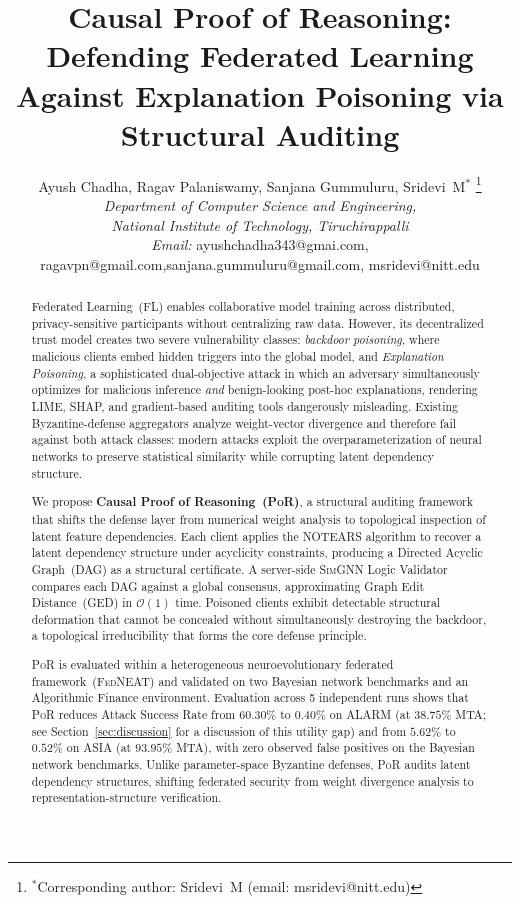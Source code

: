 \documentclass[journal]{IEEEtran}
\title{Causal Proof of Reasoning: Defending Federated Learning
       Against Explanation Poisoning via Structural Auditing}
\author{Ayush Chadha, Ragav Palaniswamy, Sanjana Gummuluru, Sridevi~M$^{*}$%
\thanks{$^{*}$Corresponding author: Sridevi~M (email: msridevi@nitt.edu)}\\
\vspace{0.2cm}\textit{Department of Computer Science and Engineering,}\\
\vspace{0.2cm}\textit{National Institute of Technology, Tiruchirappalli}\\[0.3cm]
\textit{Email:} ayushchadha343@gmai.com, ragavpn@gmail.com,sanjana.gummuluru@gmail.com, msridevi@nitt.edu\\[0.1cm]
}
\newcommand{\por}{\textsc{PoR}}
\newcommand{\fedneat}{\textsc{FedNEAT}}
\newcommand{\simgnn}{\textsc{SimGNN}}
\newcommand{\notears}{\textsc{NOTEARS}}
\begin{document}
\maketitle

\begin{abstract}
Federated Learning~(FL) enables collaborative model training across
distributed, privacy-sensitive participants without centralizing raw data.
However, its decentralized trust model creates two severe vulnerability
classes: \textit{backdoor poisoning}, where malicious clients embed hidden
triggers into the global model, and \textit{Explanation Poisoning}, a
sophisticated dual-objective attack in which an adversary simultaneously
optimizes for malicious inference \textit{and} benign-looking post-hoc
explanations, rendering LIME, SHAP, and gradient-based auditing tools
dangerously misleading. Existing Byzantine-defense aggregators analyze
weight-vector divergence and therefore fail against both attack classes:
modern attacks exploit the overparameterization of neural networks to
preserve statistical similarity while corrupting latent dependency structure.

We propose \textbf{Causal Proof of Reasoning~(\por{})}, a structural auditing
framework that shifts the defense layer from numerical weight analysis to
topological inspection of latent feature dependencies. Each client applies
the \notears{} algorithm to recover a latent dependency structure under
acyclicity constraints, producing a Directed Acyclic Graph~(DAG) as a
structural certificate. A server-side \simgnn{} Logic Validator compares
each DAG against a global consensus, approximating Graph Edit Distance~(GED)
in $\mathcal{O}(1)$ time. Poisoned clients exhibit detectable structural
deformation that cannot be concealed without simultaneously destroying the
backdoor, a topological irreducibility that forms the core defense principle.

\por{} is evaluated within a heterogeneous neuroevolutionary federated
framework~(\fedneat{}) and validated on two Bayesian network benchmarks
and an Algorithmic Finance environment. Evaluation across 5 independent
runs shows that \por{} reduces Attack Success Rate from $60.30\%$ to
$0.40\%$ on ALARM (at $38.75\%$ MTA; see Section~\ref{sec:discussion}
for a discussion of this utility gap) and from $5.62\%$ to $0.52\%$ on
ASIA (at $93.95\%$ MTA), with zero observed false positives on the
Bayesian network benchmarks. Unlike parameter-space Byzantine defenses,
\por{} audits latent dependency structures, shifting federated security
from weight divergence analysis to representation-structure verification.
\end{abstract}
\end{document}
